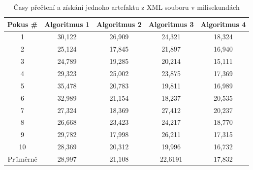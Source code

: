 \documentclass[czech,master,public,dept460,male,cpdeclaration,oneside]{diploma}
\begin{document}
\begin{table}[htp]
\centering
\begin{tabular}{@{}ccccc@{}}
\toprule
\textbf{Pokus \#} & \textbf{Algoritmus 1} & \textbf{Algoritmus 2} & \textbf{Algoritmus 3} & \textbf{Algoritmus 4} \\ \midrule
1                 & 30,122                & 26,909                & 24,321                & 18,324                \\
2                 & 25,124                & 17,845                & 21,897                & 16,940                \\
3                 & 24,789                & 19,285                & 20,214                & 15,111                \\
4                 & 29,323                & 25,002                & 23,875                & 17,369                \\
5                 & 35,478                & 20,783                & 19,811                & 16,989                \\
6                 & 32,989                & 21,154                & 18,237                & 20,535                \\
7                 & 27,324                & 18,369                & 27,412                & 20,237                \\
8                 & 26,668                & 23,423                & 24,217                & 18,770                \\
9                 & 29,782                & 17,998                & 26,211                & 17,315                \\
10                & 28,369                & 20,312                & 19,996                & 16,732                \\ \midrule
Průměrně          & 28,997               & 21,108                & 22,6191               & 17,832                \\ \bottomrule
\end{tabular}
\caption{Časy přečtení a získání jednoho artefaktu z XML souboru v milisekundách}
\label{tab:xml_read}
\end{table}
\end{document}
